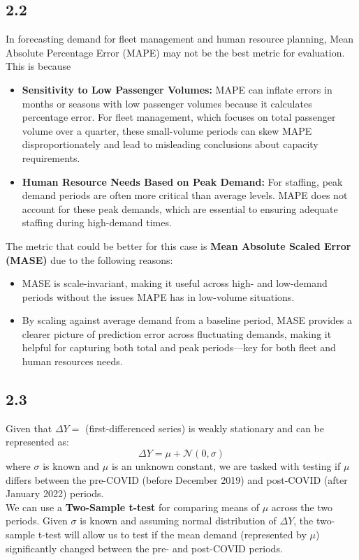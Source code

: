 \subsection{2.2}
In forecasting demand for fleet management and human resource planning, Mean
Absolute Percentage Error (MAPE) may not be the best metric for evaluation.
This is because
\begin{itemize}
	\item \textbf{Sensitivity to Low Passenger Volumes:}  MAPE can inflate
	      errors in months or seasons with low passenger volumes because it
	      calculates percentage error. For fleet management, which focuses on
	      total passenger volume over a quarter, these small-volume periods
	      can skew MAPE disproportionately and lead to misleading conclusions
	      about capacity requirements.
	\item \textbf{Human Resource Needs Based on Peak Demand:} For staffing,
	      peak demand periods are often more critical than average levels.
	      MAPE does not account for these peak demands, which are essential
	      to ensuring adequate staffing during high-demand times.
\end{itemize}

The metric that could be better for this case is \textbf{Mean Absolute Scaled Error (MASE)} due to the following reasons:
\begin{itemize}
	\item MASE is scale-invariant, making it useful across high- and
	      low-demand periods without the issues MAPE has in low-volume
	      situations.
	\item By scaling against average demand from a baseline period, MASE
	      provides a clearer picture of prediction error across fluctuating
	      demands, making it helpful for capturing both total and peak
	      periods—key for both fleet and human resources needs.
\end{itemize}

\subsection{2.3}
Given that $\Delta Y= $ (first-differenced series) is weakly stationary and can
be represented as:
\begin{equation}
	\Delta Y = \mu + \mathcal{N}(0,\sigma)
\end{equation}
where $\sigma$ is known and $\mu$ is an unknown constant, we are tasked with
testing if $\mu$ differs between the pre-COVID (before December 2019) and
post-COVID (after January 2022) periods.
\\
We can use a \textbf{Two-Sample t-test} for comparing means of $\mu$ across the
two periods. Given $\sigma$ is known and assuming normal distribution of
$\Delta Y$, the two-sample t-test will allow us to test if the mean demand
(represented by $\mu$) significantly changed between the pre- and post-COVID
periods.
